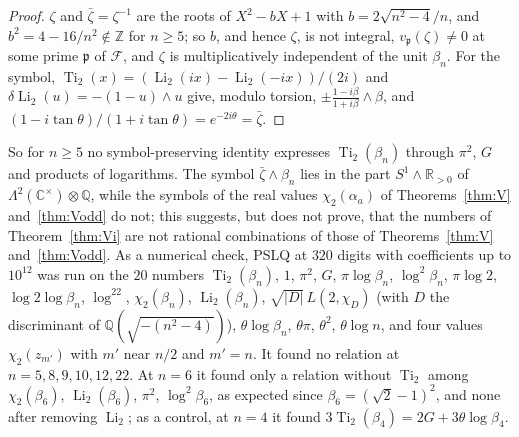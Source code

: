 \documentclass[11pt]{amsart}
\theoremstyle{definition}
\theoremstyle{remark}
\numberwithin{equation}{section}
\newcommand{\ZZ}{\mathbb{Z}}
\newcommand{\QQ}{\mathbb{Q}}
\newcommand{\RR}{\mathbb{R}}
\newcommand{\cF}{\mathcal{F}}
\newcommand{\fp}{\mathfrak{p}}
\newcommand{\Li}{\operatorname{Li}}
\newcommand{\Ti}{\operatorname{Ti}}
\begin{document}
\begin{proof}
$\zeta$ and $\bar\zeta=\zeta^{-1}$ are the roots of $X^2-bX+1$ with $b=2\sqrt{n^2-4}/n$, and $b^2=4-16/n^2\notin\ZZ$ for
$n\ge5$; so $b$, and hence $\zeta$, is not integral, $v_\fp(\zeta)\ne0$ at some prime $\fp$ of $\cF$, and $\zeta$ is
multiplicatively independent of the unit $\beta_n$. For the symbol, $\Ti_2(x)=(\Li_2(ix)-\Li_2(-ix))/(2i)$ and
$\delta\Li_2(u)=-(1-u)\wedge u$ give, modulo torsion, $\pm\frac{1-i\beta}{1+i\beta}\wedge\beta$, and
$(1-i\tan\theta)/(1+i\tan\theta)=e^{-2i\theta}=\bar\zeta$.
\end{proof}

So for $n\ge5$ no symbol-preserving identity expresses $\Ti_2(\beta_n)$ through $\pi^2$, $G$ and products of logarithms.
The symbol $\bar\zeta\wedge\beta_n$ lies in the part $S^1\wedge\RR_{>0}$ of $\Lambda^2(\mathbb C^\times)\otimes\QQ$, while the
symbols of the real values $\chi_2(\alpha_a)$ of Theorems~\ref{thm:V} and~\ref{thm:Vodd} do not; this suggests, but does
not prove, that the numbers of Theorem~\ref{thm:Vi} are not rational combinations of those of Theorems~\ref{thm:V}
and~\ref{thm:Vodd}. As a numerical check, PSLQ at $320$ digits with coefficients up to $10^{12}$ was run on the $20$
numbers $\Ti_2(\beta_n)$, $1$, $\pi^2$, $G$, $\pi\log\beta_n$, $\log^2\beta_n$, $\pi\log2$, $\log2\log\beta_n$, $\log^22$,
$\chi_2(\beta_n)$, $\Li_2(\beta_n)$, $\sqrt{|D|}\,L(2,\chi_D)$ (with $D$ the discriminant of $\QQ(\sqrt{-(n^2-4)})$),
$\theta\log\beta_n$, $\theta\pi$, $\theta^2$, $\theta\log n$, and four values $\chi_2(z_{m'})$ with $m'$ near $n/2$ and $m'=n$. It
found no relation at $n=5,8,9,10,12,22$. At $n=6$ it found only a relation without $\Ti_2$ among $\chi_2(\beta_6)$,
$\Li_2(\beta_6)$, $\pi^2$, $\log^2\beta_6$, as expected since $\beta_6=(\sqrt2-1)^2$, and none after removing $\Li_2$; as a
control, at $n=4$ it found $3\Ti_2(\beta_4)=2G+3\theta\log\beta_4$.
\end{document}

